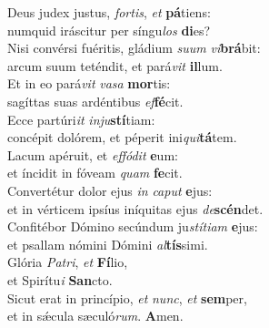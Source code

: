 \evenverse Deus judex justus, \textit{for}\textit{tis}, \textit{et} \textbf{pá}tiens:~\*\\
\evenverse numquid iráscitur per síngu\textit{los} \textbf{di}es?\\
\oddverse Nisi convérsi fuéritis, gládium \textit{su}\textit{um} \textit{vi}\textbf{brá}bit:~\*\\
\oddverse arcum suum teténdit, et pará\textit{vit} \textbf{il}lum.\\
\evenverse Et in eo pará\textit{vit} \textit{va}\textit{sa} \textbf{mor}tis:~\*\\
\evenverse sagíttas suas ardéntibus \textit{ef}\textbf{fé}cit.\\
\oddverse Ecce partúri\textit{it} \textit{in}\textit{ju}\textbf{stí}tiam:~\*\\
\oddverse concépit dolórem, et péperit ini\textit{qui}\textbf{tá}tem.\\
\evenverse Lacum apéruit, et \textit{ef}\textit{fó}\textit{dit} \textbf{e}um:~\*\\
\evenverse et íncidit in fóveam \textit{quam} \textbf{fe}cit.\\
\oddverse Convertétur dolor ejus \textit{in} \textit{ca}\textit{put} \textbf{e}jus:~\*\\
\oddverse et in vérticem ipsíus iníquitas ejus \textit{de}\textbf{scén}det.\\
\evenverse Confitébor Dómino secúndum ju\textit{stí}\textit{ti}\textit{am} \textbf{e}jus:~\*\\
\evenverse et psallam nómini Dómini \textit{al}\textbf{tís}simi.\\
\oddverse Glória \textit{Pa}\textit{tri}, \textit{et} \textbf{Fí}lio,~\*\\
\oddverse et Spirítu\textit{i} \textbf{San}cto.\\
\evenverse Sicut erat in princípio, \textit{et} \textit{nunc}, \textit{et} \textbf{sem}per,~\*\\
\evenverse et in sǽcula sæculó\textit{rum}. \textbf{A}men.\\

